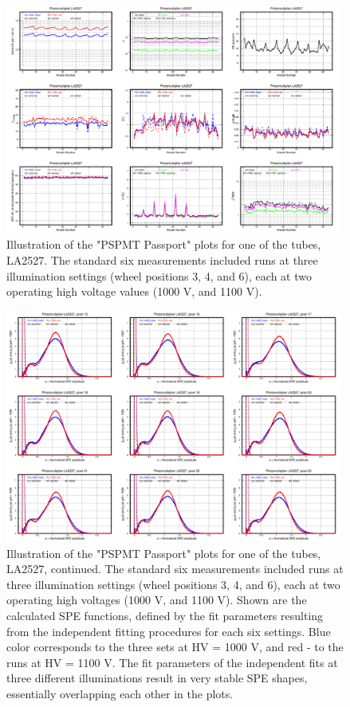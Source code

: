 \begin{figure}
	\centering
	\includegraphics[width=0.99\textwidth,height=.55\textwidth]{figures/pavel_temp/LA2527_passport_temp.png}
	\caption{Illustration of the "PSPMT Passport" plots for one of the tubes, LA2527. The standard six measurements included runs at three illumination settings (wheel positions 3, 4, and 6), each at two operating high voltage values (1000 V, and 1100 V).}
	\label{fig:LA2527_passport}
\end{figure}

\begin{figure}
	\centering
	\includegraphics[width=0.99\textwidth,height=.55\textwidth]{figures/pavel_temp/LA2527_spectra_temp.png}
	\caption{Illustration of the "PSPMT Passport" plots for one of the tubes, LA2527, continued. The standard six measurements included runs at three illumination settings (wheel positions 3, 4, and 6), each at two operating high voltages (1000 V, and 1100 V). Shown are the calculated SPE functions, defined by the fit parameters resulting from the independent fitting procedures for each six settings. Blue color corresponds to the three sets at HV = 1000 V, and red - to the runs at HV = 1100 V. The fit parameters of the independent fits at three different illuminations result in very stable SPE shapes, essentially overlapping each other in the plots.}
	\label{fig:LA2527_passport_spectra}
\end{figure}




